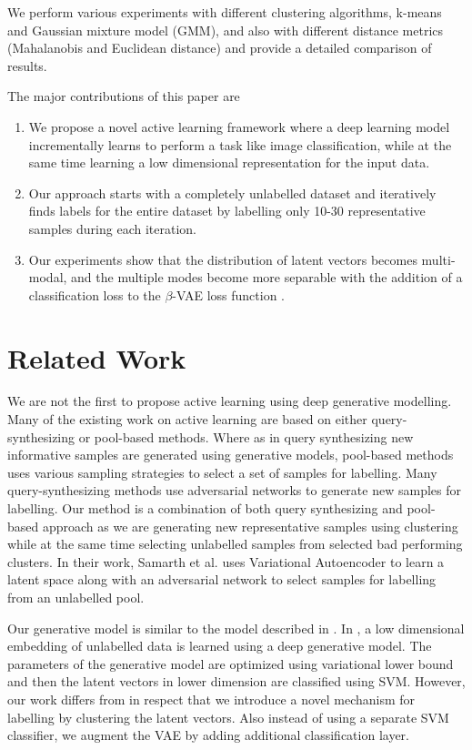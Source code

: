 \documentclass{bmvc2k}
\begin{document}
We perform various experiments with different clustering algorithms,  k-means and Gaussian mixture model (GMM), and also with different distance metrics (Mahalanobis and Euclidean distance) and provide a detailed comparison of results.

The major contributions of this paper are
\begin{enumerate}
    \item We propose a novel active learning framework where a  deep learning model incrementally learns to perform a task like image classification, while at the same time learning a low dimensional representation for the input data.
    \item Our approach starts with a completely unlabelled dataset and iteratively finds labels for the entire dataset by labelling only 10-30 representative samples during each iteration.
    \item Our experiments show that the distribution of latent vectors becomes multi-modal, and the multiple modes become more separable with the addition of a classification loss to the $\beta$-VAE loss function \cite{beta_vae}.
\end{enumerate}

\section{Related Work}
We are not the first to propose active learning using deep generative modelling.
Many of the existing work on active learning are based on either query-synthesizing or  pool-based methods.
Where as in query synthesizing new informative samples are generated using generative models, pool-based methods \cite{wang_2016,beluch_2018} uses various sampling strategies to select a set of samples for labelling.
Many query-synthesizing methods use adversarial networks \cite{mahapatra_2018,mayer_2020} to generate new samples for labelling.
Our method is a combination of both query synthesizing and pool-based approach as we are generating new representative samples using clustering while at the same time selecting unlabelled samples from selected bad performing clusters.
In their work, Samarth et al. \cite{vaal} uses Variational Autoencoder to learn a latent space along with an adversarial network to select samples for labelling from an unlabelled pool.

Our generative model is similar to the model described in \cite{kingma_2014}.
In \cite{kingma_2014}, a low dimensional embedding of unlabelled data is learned using a deep generative model.
The parameters of the generative model are optimized using variational lower bound and then the latent vectors in lower dimension are classified using SVM.
However, our work differs from \cite{kingma_2014} in respect that we introduce a novel mechanism for labelling by clustering the latent vectors.
Also instead of using a separate SVM classifier, we augment the VAE by adding additional classification layer.
\end{document}
